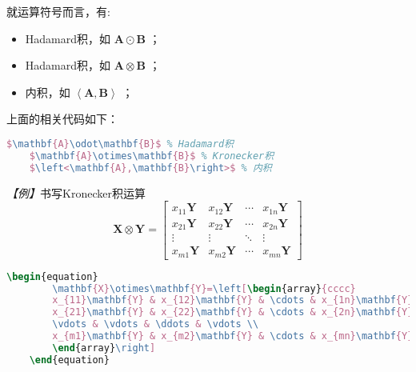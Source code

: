 就运算符号而言，有:
\begin{itemize}
    \item Hadamard积，如 $\mathbf{A}\odot\mathbf{B}$ ；
    \item Hadamard积，如 $\mathbf{A}\otimes\mathbf{B}$ ；
    \item 内积，如 $\left<\mathbf{A},\mathbf{B}\right>$ ；
\end{itemize}

上面的相关代码如下：
\begin{lstlisting}[language=TeX]
    $\mathbf{A}\odot\mathbf{B}$ % Hadamard积
    $\mathbf{A}\otimes\mathbf{B}$ % Kronecker积
    $\left<\mathbf{A},\mathbf{B}\right>$ % 内积
\end{lstlisting}

\emph{【例】}书写Kronecker积运算
\begin{equation}
    \mathbf{X}\otimes\mathbf{Y}=\left[\begin{array}{cccc}
            x_{11}\mathbf{Y} & x_{12}\mathbf{Y} & \cdots & x_{1n}\mathbf{Y} \\
            x_{21}\mathbf{Y} & x_{22}\mathbf{Y} & \cdots & x_{2n}\mathbf{Y} \\
            \vdots           & \vdots           & \ddots & \vdots           \\
            x_{m1}\mathbf{Y} & x_{m2}\mathbf{Y} & \cdots & x_{mn}\mathbf{Y}
        \end{array}\right]
\end{equation}
\begin{lstlisting}[language=TeX]
    \begin{equation}
        \mathbf{X}\otimes\mathbf{Y}=\left[\begin{array}{cccc}
        x_{11}\mathbf{Y} & x_{12}\mathbf{Y} & \cdots & x_{1n}\mathbf{Y} \\
        x_{21}\mathbf{Y} & x_{22}\mathbf{Y} & \cdots & x_{2n}\mathbf{Y} \\
        \vdots & \vdots & \ddots & \vdots \\
        x_{m1}\mathbf{Y} & x_{m2}\mathbf{Y} & \cdots & x_{mn}\mathbf{Y}
        \end{array}\right]
    \end{equation}
\end{lstlisting}


